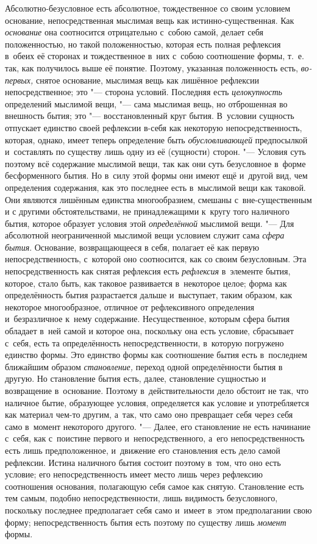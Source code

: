 Абсолютно-безусловное есть абсолютное,
тождественное со своим условием основание, непосредственная мыслимая вещь
как истинно-существенная. Как {\em основание} она
соотносится отрицательно с~собою самой, делает себя положенностью, но такой
положенностью, которая есть полная рефлексия в~обеих её сторонах и
тождественное в~них с~собою соотношение формы, т.~е. так, как получилось
выше её понятие. Поэтому, указанная положенность есть,
{\em во-первых,} снятое основание, мыслимая вещь как
лишённое рефлексии непосредственное; это "--- сторона условий. Последняя есть
{\em целокупность} определений мыслимой вещи, "--- сама
мыслимая вещь, но отброшенная во внешность бытия; это "--- восстановленный
круг бытия. В~условии сущность отпускает единство своей рефлексии в-себя
как некоторую непосредственность, которая, однако, имеет теперь определение
быть {\em обусловливающей} предпосылкой и~составлять по
существу лишь одну из её (сущности) сторон. "--- Условия суть поэтому всё
содержание мыслимой вещи, так как они суть безусловное в~форме
бесформенного бытия. Но в~силу этой формы они имеют ещё и~другой вид, чем
определения содержания, как это последнее есть в~мыслимой вещи как таковой.
Они являются лишённым единства многообразием, смешаны с~вне-существенным и
с другими обстоятельствами, не принадлежащими к~кругу того наличного бытия,
которое образует условия этой {\em определённой}
мыслимой вещи. "--- Для абсолютной неограниченной мыслимой вещи условием служит
сама {\em сфера бытия}. Основание, возвращающееся в
себя, полагает её как первую непосредственность, с~которой оно соотносится,
как со своим безусловным. Эта непосредственность как снятая рефлексия есть
{\em рефлексия} в~элементе бытия, которое, стало быть,
как таковое развивается в~некоторое целое; форма как определённость бытия
разрастается дальше и~выступает, таким образом, как некоторое
многообразное, отличное от рефлексивного определения и~безразличное к~нему
содержание. Несущественное, которым сфера бытия обладает в~ней самой и
которое она, поскольку она есть условие, сбрасывает с~себя, есть та
определённость непосредственности, в~которую погружено единство формы. Это
единство формы как соотношение бытия есть в~последнем ближайшим образом
{\em становление,} переход одной определённости бытия в
другую. Но становление бытия есть, далее, становление сущностью и
возвращение в~основание. Поэтому в~действительности дело обстоит не так,
что наличное бытие, образующее условия, определяется как условие и
употребляется как материал чем-то другим, а~так, что само оно превращает
себя через себя само в~момент некоторого другого. "--- Далее, его становление
не есть начинание с~себя, как с~поистине первого и~непосредственного, а~его
непосредственность есть лишь предположенное, и~движение его становления
есть дело самой рефлексии. Истина наличного бытия состоит поэтому в~том,
что оно есть условие; его непосредственность имеет место лишь через
рефлексию соотношения основания, полагающую себя самое как снятую.
Становление есть тем самым, подобно непосредственности, лишь видимость
безусловного, поскольку последнее предполагает себя само и~имеет в~этом
предполагании свою форму; непосредственность бытия есть поэтому по существу
лишь {\em момент} формы.

